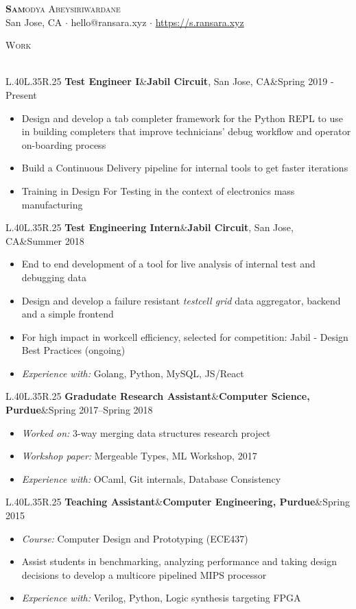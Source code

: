 \documentclass[a4paper]{article}
\newcommand{\header} [1] {
    {\hspace*{-18pt}\vspace*{6pt} \textsc{#1}
    \vspace*{-14pt} \\ \hspace*{-18pt} \hrulefill{} \\
    \vspace{1mm}}
}
\newcommand{\threeparts} [3] {
    {\setlength\tabcolsep{0pt}
    \begin{tabularx}{\linewidth}{L{.40\linewidth}L{.35\linewidth}R{.25\linewidth}} 
    \textbf{#1}&#2&#3
    \end{tabularx}}
}
\begin{document}
\begin{center}
	{\Huge \scshape {\textbf{Sam}odya Abeysiriwardane}}\\
	San Jose, CA $\cdot$ hello@ransara.xyz $\cdot$ \url{https://s.ransara.xyz}\\
\end{center}

\header{Work}
\threeparts{Test Engineer I}{\textbf{Jabil Circuit}, San Jose, CA}{Spring 2019 - Present}
\begin{itemize}[label=$\square$]
	\item Design and develop a tab completer framework for the Python REPL to use in building completers that improve technicians' debug workflow and operator on-boarding process
    \item Build a Continuous Delivery pipeline for internal tools to get faster iterations
    \item Training in Design For Testing in the context of electronics mass manufacturing
\end{itemize}
\threeparts{Test Engineering Intern}{\textbf{Jabil Circuit}, San Jose, CA}{Summer 2018}
\begin{itemize}[label=$\square$]
	\item End to end development of a tool for live analysis of internal test and debugging data
    \item Design and develop a failure resistant \textit{testcell grid} data aggregator, backend and a simple frontend
    \item For high impact in workcell efficiency, selected for competition: Jabil - Design Best Practices (ongoing) 
    \item \textit{Experience with:} Golang, Python, MySQL, JS/React
\end{itemize}
\threeparts{Gradudate Research Assistant}{\textbf{Computer Science, Purdue}}{Spring 2017--Spring 2018}
\begin{itemize}[label=$\square$]
    \item \textit{Worked on:} 3-way merging data structures research project
    \item \textit{Workshop paper:} Mergeable Types, ML Workshop, 2017
	\item \textit{Experience with:} OCaml, Git internals, Database Consistency
\end{itemize}
\threeparts{Teaching Assistant}{\textbf{Computer Engineering, Purdue}}{Spring 2015}
\begin{itemize}[label=$\square$]
	\item \textit{Course:} Computer Design and Prototyping (ECE437)
    \item Assist students in benchmarking, analyzing performance and taking design decisions to develop a multicore pipelined MIPS processor
    \item \textit{Experience with:} Verilog, Python, Logic synthesis targeting FPGA
\end{itemize}
\end{document}
